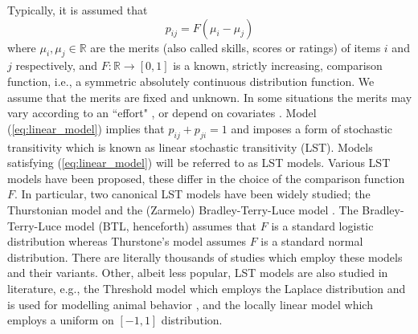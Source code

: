 \documentclass[twoside,11pt]{article}
\begin{document}
Typically, it is assumed that 
\begin{equation}
\label{eq:linear_model}
    p_{ij} = F(\mu_i-\mu_j)
\end{equation}
where $\mu_i,\mu_j\in\mathbb{R}$ are the merits (also called skills, scores or ratings) of items $i$ and $j$ respectively, and $F:\mathbb{R} \to [0,1]$ is a known, strictly increasing, comparison function, i.e., a symmetric absolutely continuous distribution function. We assume that the merits are fixed and unknown. In some situations the merits may vary according to an ``effort"  \citep{jia}, or depend on covariates \citep{herbrich, allison}. Model (\ref{eq:linear_model}) implies that $p_{ij}+p_{ji}=1$ and imposes a form of stochastic transitivity \citep{morrison,regenwetter3} which is known as linear stochastic transitivity (LST). Models satisfying (\ref{eq:linear_model}) will be referred to as LST models.  Various LST models have been proposed, these differ in the choice of the comparison function $F$. In particular, two canonical LST models have been widely studied; the Thurstonian model \citep{thurstone} and the (Zarmelo) Bradley-Terry-Luce model \citep{zermelo,bradley1}. The Bradley-Terry-Luce  model (BTL, henceforth) assumes that $F$ is a standard logistic distribution whereas  Thurstone's model assumes $F$ is a standard normal distribution. There are literally thousands of studies which employ these models and their variants. Other, albeit less popular, LST models are also studied in literature, e.g., the Threshold model which employs the Laplace distribution and is used for modelling animal behavior \citep{yellott}, and the locally linear model  \citep{batchelder} which employs a uniform on $[-1,1]$ distribution. 
\end{document}
